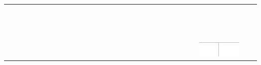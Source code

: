 \documentclass[10pt]{article}
\begin{document}
\begin{center}
\begin{tabular}{|c|c|c|c|c|c|c|c|c|c|c|c|c|c|c|c|c|c|c|c|c|c|c|c|c|c|c|c|c|c|}
\hline
 &  &  &  &  &  &  &  &  &  &  &  &  &  &  &  &  &  &  &  &  &  &  &  &  &  &  &  &  &  \\
\hline
 &  &  &  &  &  &  &  &  &  &  &  &  &  &  &  &  &  &  &  &  &  &  &  &  &  &  &  &  &  \\
\hline
 &  &  &  &  &  &  &  &  &  &  &  &  &  &  &  &  &  &  &  &  &  &  &  &  &  &  &  &  &  \\
\hline
 &  &  &  &  &  &  &  &  &  &  &  &  &  &  &  &  &  &  &  &  &  &  &  &  &  &  &  &  &  \\
\hline
 &  &  &  &  &  &  &  &  &  &  &  &  &  &  &  &  &  &  &  &  &  &  &  &  &  &  &  &  &  \\
\hline
 &  &  &  &  &  &  &  &  &  &  &  &  &  &  &  &  &  &  &  &  &  &  &  &  &  &  &  &  &  \\
\hline
 &  &  &  &  &  &  &  &  &  &  &  &  &  &  &  &  &  &  &  &  &  &  &  &  &  &  &  &  &  \\
\hline
 &  &  &  &  &  &  &  &  &  &  &  &  &  &  &  &  &  &  &  &  &  &  &  &  &  &  &  &  &  \\
\hline
 &  &  &  &  &  &  &  &  &  &  &  &  &  &  &  &  &  &  &  &  &  &  &  &  &  &  &  &  &  \\
\hline
 &  &  &  &  &  &  &  &  &  &  &  &  &  &  &  &  &  &  &  &  &  &  &  &  &  &  &  &  &  \\
\hline
 &  &  &  &  &  &  &  &  &  &  &  &  &  &  &  &  &  &  &  &  &  &  &  &  &  &  &  &  &  \\
\hline
 &  &  &  &  &  &  &  &  &  &  &  &  &  &  &  &  &  &  &  &  &  &  &  &  &  &  &  &  &  \\
\hline
 &  &  &  &  &  &  &  &  &  &  &  &  &  &  &  &  &  &  &  &  &  &  &  &  &  &  &  &  &  \\
\hline
 &  &  &  &  &  &  &  &  &  &  &  &  &  &  &  &  &  &  &  &  &  &  &  &  &  &  &  &  &  \\
\hline
 &  &  &  &  &  &  &  &  &  &  &  &  &  &  &  &  &  &  &  &  &  &  &  &  &  &  &  &  &  \\
\hline
 &  &  &  &  &  &  &  &  &  &  &  &  &  &  &  &  &  &  &  &  &  &  &  &  &  &  & \includegraphics[max width=\textwidth]{2024_11_21_6438f6dbc3784fe6d1deg-09}

\end{tabular}
\end{center}
\end{document}
